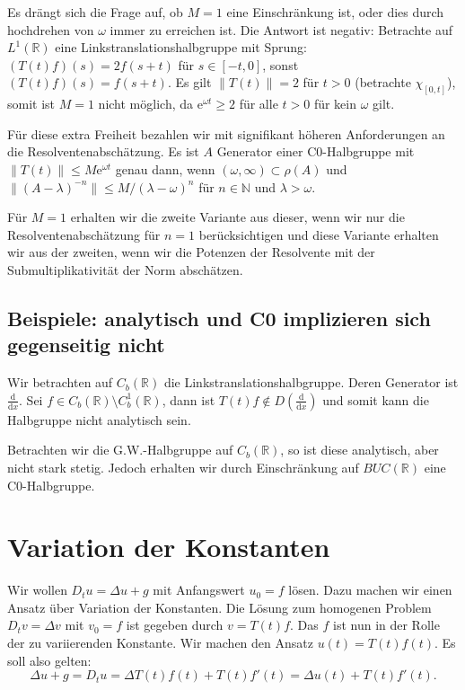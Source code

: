 \documentclass[11pt,a4paper]{scrartcl}
\newcommand{\N}{\mathbb{N}} %
\newcommand{\R}{\mathbb{R}} %
\theoremstyle{plain}
\theoremstyle{definition}
\theoremstyle{remark}
\begin{document}
Es drängt sich die Frage auf, ob $M=1$ eine Einschränkung ist, oder dies durch hochdrehen von $\omega$ immer zu erreichen ist. Die Antwort ist negativ: Betrachte auf $L^1(\R)$ eine Linkstranslationshalbgruppe mit Sprung: $(T(t)f)(s) = 2f(s+t)$ für $s\in [-t,0]$, sonst $(T(t)f)(s)=f(s+t)$. Es gilt $\|T(t)\|=2$ für $t>0$ (betrachte $\chi_{[0,t]}$), somit ist $M=1$ nicht möglich, da $\mathrm{e}^{\omega t} \geq 2$ für alle $t>0$ für kein $\omega$ gilt.

Für diese extra Freiheit bezahlen wir mit signifikant höheren Anforderungen an die Resolventenabschätzung. Es ist $A$ Generator einer C0-Halbgruppe mit $\|T(t)\|\leq M \mathrm{e}^{\omega t}$ genau dann, wenn $(\omega, \infty)\subset \rho(A)$ und $\|(A-\lambda)^{-n}\| \leq M/(\lambda-\omega)^n$ für $n\in \N$ und $\lambda > \omega$.

Für $M=1$ erhalten wir die zweite Variante aus dieser, wenn wir nur die Resolventenabschätzung für $n=1$ berücksichtigen und diese Variante erhalten wir aus der zweiten, wenn wir die Potenzen der Resolvente mit der Submultiplikativität der Norm abschätzen.

\subsection{Beispiele: analytisch und C0 implizieren sich gegenseitig nicht}

Wir betrachten auf $C_b(\R)$ die Linkstranslationshalbgruppe. Deren Generator ist $\frac{\mathrm{d}}{\mathrm{d}x}$. Sei $f\in C_b(\R) \setminus C_b^1(\R)$, dann ist $T(t)f \not\in D(\frac{\mathrm{d}}{\mathrm{d}x})$ und somit kann die Halbgruppe nicht analytisch sein.

Betrachten wir die G.W.-Halbgruppe auf $C_b(\R)$, so ist diese analytisch, aber nicht stark stetig. Jedoch erhalten wir durch Einschränkung auf $BUC(\R)$ eine C0-Halbgruppe.



\section{Variation der Konstanten}

Wir wollen $D_t u = \Delta u + g$ mit Anfangswert $u_0=f$ lösen. Dazu machen wir einen Ansatz über Variation der Konstanten. Die Lösung zum homogenen Problem $D_t v = \Delta v$ mit $v_0=f$ ist gegeben durch $v=T(t)f$. Das $f$ ist nun in der Rolle der zu variierenden Konstante. Wir machen den Ansatz $u(t)=T(t)f(t)$. Es soll also gelten: $$\Delta u + g = D_t u = \Delta T(t)f(t) + T(t)f'(t) = \Delta u(t) + T(t)f'(t).$$
\end{document}
